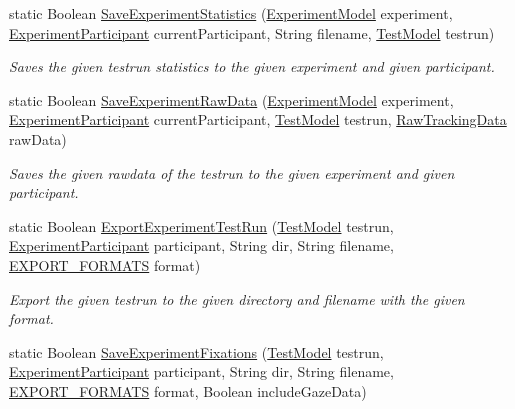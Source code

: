 \begin{DoxyCompactItemize}
static Boolean \hyperlink{class_web_analyzer_1_1_controller_1_1_export_controller_a08b9a190bd2cf514d7c2989e8e121703}{Save\+Experiment\+Statistics} (\hyperlink{class_web_analyzer_1_1_models_1_1_base_1_1_experiment_model}{Experiment\+Model} experiment, \hyperlink{class_web_analyzer_1_1_models_1_1_base_1_1_experiment_participant}{Experiment\+Participant} current\+Participant, String filename, \hyperlink{class_web_analyzer_1_1_models_1_1_data_model_1_1_test_model}{Test\+Model} testrun)
\begin{DoxyCompactList}\small\item\em Saves the given testrun statistics to the given experiment and given participant. \end{DoxyCompactList}\item 
static Boolean \hyperlink{class_web_analyzer_1_1_controller_1_1_export_controller_a08a2ba34501efa8e3cca837af7a3dd07}{Save\+Experiment\+Raw\+Data} (\hyperlink{class_web_analyzer_1_1_models_1_1_base_1_1_experiment_model}{Experiment\+Model} experiment, \hyperlink{class_web_analyzer_1_1_models_1_1_base_1_1_experiment_participant}{Experiment\+Participant} current\+Participant, \hyperlink{class_web_analyzer_1_1_models_1_1_data_model_1_1_test_model}{Test\+Model} testrun, \hyperlink{class_web_analyzer_1_1_models_1_1_base_1_1_raw_tracking_data}{Raw\+Tracking\+Data} raw\+Data)
\begin{DoxyCompactList}\small\item\em Saves the given rawdata of the testrun to the given experiment and given participant. \end{DoxyCompactList}\item 
static Boolean \hyperlink{class_web_analyzer_1_1_controller_1_1_export_controller_a9f312de4f46d4bfb9c33b4f7ce79e79d}{Export\+Experiment\+Test\+Run} (\hyperlink{class_web_analyzer_1_1_models_1_1_data_model_1_1_test_model}{Test\+Model} testrun, \hyperlink{class_web_analyzer_1_1_models_1_1_base_1_1_experiment_participant}{Experiment\+Participant} participant, String dir, String filename, \hyperlink{class_web_analyzer_1_1_controller_1_1_export_controller_a8cea4a311ecaf495f305f9d7829a57aa}{E\+X\+P\+O\+R\+T\+\_\+\+F\+O\+R\+M\+A\+T\+S} format)
\begin{DoxyCompactList}\small\item\em Export the given testrun to the given directory and filename with the given format. \end{DoxyCompactList}\item 
static Boolean \hyperlink{class_web_analyzer_1_1_controller_1_1_export_controller_a56bbd706bd4f1e32c603893c5216d132}{Save\+Experiment\+Fixations} (\hyperlink{class_web_analyzer_1_1_models_1_1_data_model_1_1_test_model}{Test\+Model} testrun, \hyperlink{class_web_analyzer_1_1_models_1_1_base_1_1_experiment_participant}{Experiment\+Participant} participant, String dir, String filename, \hyperlink{class_web_analyzer_1_1_controller_1_1_export_controller_a8cea4a311ecaf495f305f9d7829a57aa}{E\+X\+P\+O\+R\+T\+\_\+\+F\+O\+R\+M\+A\+T\+S} format, Boolean include\+Gaze\+Data)

\end{DoxyCompactItemize}

